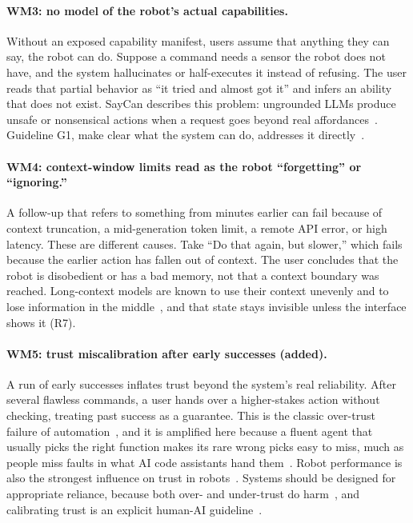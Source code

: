 \documentclass[sigconf]{acmart}
\begin{document}
\paragraph{WM3: no model of the robot's actual capabilities.}
Without an exposed capability manifest, users assume that anything they can say, the robot can do. Suppose a command needs a sensor the robot does not have, and the system hallucinates or half-executes it instead of refusing. The user reads that partial behavior as ``it tried and almost got it'' and infers an ability that does not exist. SayCan describes this problem: ungrounded LLMs produce unsafe or nonsensical actions when a request goes beyond real affordances~\cite{ahn2022saycan}. Guideline G1, make clear what the system can do, addresses it directly~\cite{amershi2019guidelines}.

\paragraph{WM4: context-window limits read as the robot ``forgetting'' or ``ignoring.''}
A follow-up that refers to something from minutes earlier can fail because of context truncation, a mid-generation token limit, a remote API error, or high latency. These are different causes. Take ``Do that again, but slower,'' which fails because the earlier action has fallen out of context. The user concludes that the robot is disobedient or has a bad memory, not that a context boundary was reached. Long-context models are known to use their context unevenly and to lose information in the middle~\cite{liu2024lost}, and that state stays invisible unless the interface shows it (R7).

\paragraph{WM5: trust miscalibration after early successes (added).}
A run of early successes inflates trust beyond the system's real reliability. After several flawless commands, a user hands over a higher-stakes action without checking, treating past success as a guarantee. This is the classic over-trust failure of automation~\cite{parasuraman1997humans, dzindolet2003role}, and it is amplified here because a fluent agent that usually picks the right function makes its rare wrong picks easy to miss, much as people miss faults in what AI code assistants hand them~\cite{perry2023users, vaithilingam2022expectation}. Robot performance is also the strongest influence on trust in robots~\cite{hancock2011meta}. Systems should be designed for appropriate reliance, because both over- and under-trust do harm~\cite{lee2004trust}, and calibrating trust is an explicit human-AI guideline~\cite{amershi2019guidelines}.
\end{document}
